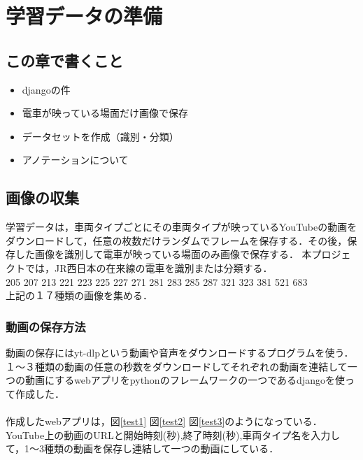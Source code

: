 

\chapter{学習データの準備}\label{genri}
\section{この章で書くこと}
\begin{itemize}
	\item djangoの件
	\item 電車が映っている場面だけ画像で保存
	\item データセットを作成（識別・分類）
	\item アノテーションについて
\end{itemize}

\section{画像の収集}
学習データは，車両タイプごとにその車両タイプが映っているYouTubeの動画をダウンロードして，任意の枚数だけランダムでフレームを保存する．その後，保存した画像を識別して電車が映っている場面のみ画像で保存する．
本プロジェクトでは，JR西日本の在来線の電車を識別または分類する．\\
205  207  213  221  223  225  227  271  281  283  285  287  321  323  381  521  683 \\
上記の１７種類の画像を集める．
\subsection{動画の保存方法}
動画の保存にはyt-dlpという動画や音声をダウンロードするプログラムを使う．
１〜３種類の動画の任意の秒数をダウンロードしてそれぞれの動画を連結して一つの動画にするwebアプリをpythonのフレームワークの一つであるdjangoを使って作成した．\\
	\\
	作成したwebアプリは，図\ref{test1} 図\ref{test2}  図\ref{test3}のようになっている．
	YouTube上の動画のURLと開始時刻(秒),終了時刻(秒),車両タイプ名を入力して，1〜3種類の動画を保存し連結して一つの動画にしている．
	

